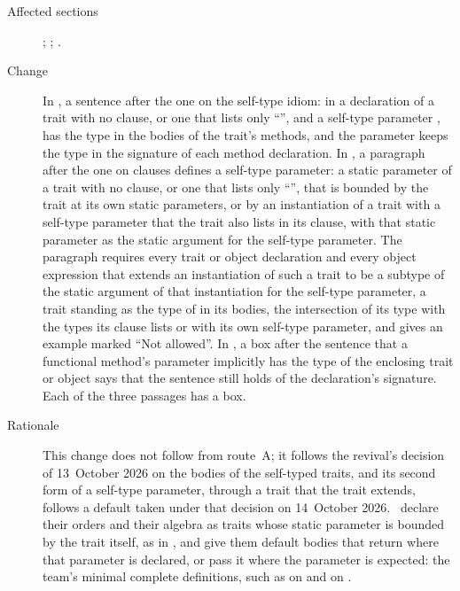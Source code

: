 \begin{description}
\item[Affected sections] ; ; .
\item[Change] In , a sentence after the one on the self-type
idiom: in a declaration of a trait  with no  clause, or one that lists only ``\EXP{\ldots}'', and a
self-type parameter ,  has the type  in the bodies of
the trait's methods, and the  parameter keeps the type  in the
signature of each method declaration.
In , a paragraph after the one on  clauses
defines a self-type parameter: a static parameter of a trait with no
 clause, or one that lists only ``\EXP{\ldots}'', that is bounded by the trait at its own static
parameters, or by an instantiation of a trait with a self-type parameter that the
trait also lists in its  clause, with that static parameter as the
static argument for the self-type parameter.
The paragraph requires every trait or object declaration and every object
expression that extends an instantiation of such a trait to be a subtype of
the static argument of that instantiation for the self-type parameter, a trait
standing as the type of  in its bodies, the intersection of its type with the types
its  clause lists or with its own self-type parameter, and gives an example marked ``Not allowed''.
In , a box after the sentence that a functional method's
 parameter implicitly has the type of the enclosing trait or object
says that the sentence still holds of the declaration's signature.
Each of the three passages has a box.
\item[Rationale] This change does not follow from route~A; it follows the
revival's decision of 13~October 2026 on the bodies of the self-typed traits,
and its second form of a self-type parameter, through a trait that the trait
extends, follows a default taken under that decision on 14~October 2026.
\library\ declare their orders and their algebra as traits whose static
parameter is bounded by the trait itself, as in
,
and give them default bodies that return  where that parameter is
declared, or pass it where the parameter is expected: the team's minimal
complete definitions, such as  on  and
 on .

\end{description}
